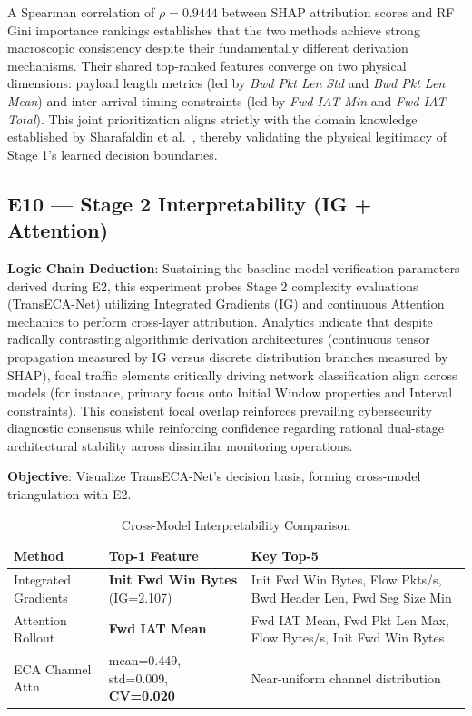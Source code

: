 \documentclass[sigconf]{acmart}
\begin{document}
A Spearman correlation of $\rho = 0.9444$ between SHAP attribution scores and RF Gini importance rankings establishes that the two methods achieve strong macroscopic consistency despite their fundamentally different derivation mechanisms. Their shared top-ranked features converge on two physical dimensions: payload length metrics (led by \textit{Bwd Pkt Len Std} and \textit{Bwd Pkt Len Mean}) and inter-arrival timing constraints (led by \textit{Fwd IAT Min} and \textit{Fwd IAT Total}). This joint prioritization aligns strictly with the domain knowledge established by Sharafaldin et al.\ \cite{17}, thereby validating the physical legitimacy of Stage 1's learned decision boundaries.

\subsection{E10 --- Stage 2 Interpretability (IG + Attention)}
\textbf{Logic Chain Deduction}: Sustaining the baseline model verification parameters derived during E2, this experiment probes Stage 2 complexity evaluations (TransECA-Net) utilizing Integrated Gradients (IG) and continuous Attention mechanics to perform cross-layer attribution. Analytics indicate that despite radically contrasting algorithmic derivation architectures (continuous tensor propagation measured by IG versus discrete distribution branches measured by SHAP), focal traffic elements critically driving network classification align across models (for instance, primary focus onto Initial Window properties and Interval constraints). This consistent focal overlap reinforces prevailing cybersecurity diagnostic consensus while reinforcing confidence regarding rational dual-stage architectural stability across dissimilar monitoring operations.

\textbf{Objective}: Visualize TransECA-Net's decision basis, forming cross-model triangulation with E2.


\begin{table}[!t]
\caption{Cross-Model Interpretability Comparison}
\label{tab:interpretability_comparison}
\begin{tabular}{p{3.5cm}p{4.5cm}p{8.4cm}}
\toprule
\textbf{Method} & \textbf{Top-1 Feature} & \textbf{Key Top-5} \\
\midrule
Integrated Gradients & \textbf{Init Fwd Win Bytes} (IG=2.107) & Init Fwd Win Bytes, Flow Pkts/s, Bwd Header Len, Fwd Seg Size Min \\
Attention Rollout & \textbf{Fwd IAT Mean} & Fwd IAT Mean, Fwd Pkt Len Max, Flow Bytes/s, Init Fwd Win Bytes \\
ECA Channel Attn & mean=0.449, std=0.009, \textbf{CV=0.020} & Near-uniform channel distribution \\
\bottomrule
\end{tabular}
\end{table}
\end{document}
